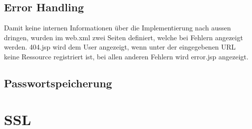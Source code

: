 \documentclass[12pt]{scrartcl}
\begin{document}
\subsection{Error Handling}
Damit keine internen Informationen über die Implementierung nach aussen dringen, wurden im web.xml zwei Seiten definiert, welche bei Fehlern angezeigt werden. 404.jsp wird dem User angezeigt, wenn unter der eingegebenen URL keine Ressource registriert ist, bei allen anderen Fehlern wird error.jsp angezeigt.

\subsection{Passwortspeicherung}


\section{SSL}
\end{document}
